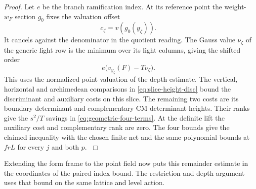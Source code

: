 \begin{proof}
Let \(e\) be the branch ramification index. At its reference point the weight-\(w_F\) section \(g_0\) fixes the valuation offset
\[
 c_\zeta=v(g_0(y_\zeta)).
\]
It cancels against the denominator in the quotient reading.
The Gauss value \(\nu_\zeta\) of the generic light row is the
minimum over its light columns, giving the shifted order
\[
              e\bigl(v_{y_\zeta}(F)-T\nu_\zeta\bigr).
\]
This uses the normalized point valuation of the depth estimate.
The vertical, horizontal and archimedean comparisons in
\eqref{eq:slice-height-disc} bound the discriminant and auxiliary
costs on this slice. The remaining two costs are its boundary
determinant and complementary CM determinant heights. Their
ranks give the \(s^2/T\) savings in \eqref{eq:geometric-four-terms}.
At the definite lift the auxiliary cost and complementary rank
are zero. The four bounds give the claimed inequality with the
chosen finite net and the same polynomial bounds at \(frL\)
for every \(j\) and both \(p\).
\label{cor:completed-division-12}
\end{proof}

Extending the form frame to the point field now puts this remainder
estimate in the coordinates of the paired index bound. The
restriction and depth argument uses that bound on the same
lattice and level action. \label{cor:completed-division-13}


